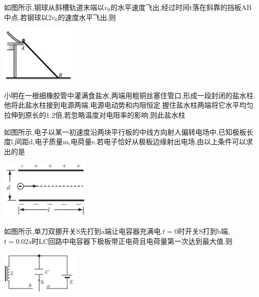 \question[6]如图所示,钢球从斜槽轨道末端以$v_0$的水平速度飞出,经过时间t落在斜靠的挡板AB中点.若钢球以$2v_0$的速度水平飞出,则\key{}\begin{center}\includegraphics[]{img/image3.png}\end{center}
\begin{solution}{4cm}

\end{solution}



\question[6]小明在一根细橡胶管中灌满食盐水,两端用粗铜丝塞住管口,形成一段封闭的盐水柱.他将此盐水柱接到电源两端,电源电动势和内阻恒定.握住盐水柱两端将它水平均匀拉伸到原长的$1.2$倍,若忽略温度对电阻率的影响,则此盐水柱\key{}
\begin{solution}{4cm}

\end{solution}



\question[6]如图所示,电子以某一初速度沿两块平行板的中线方向射人偏转电场中,已知极板长度l,间距d,电子质量m,电荷量e.若电子恰好从极板边缘射出电场,由以上条件可以求出的是\key{}\begin{center}\includegraphics[]{img/image4.png}\end{center}
\begin{solution}{4cm}

\end{solution}



\question[6]如图所示,单刀双挪开关S先打到a端让电容器充满电$.t=0$时开关S打到b端,$t=0.02s$时LC回路中电容器下极板带正电荷且电荷量第一次达到最大值.则\key{}\begin{center}\includegraphics[]{img/image5.png}\end{center}
\begin{solution}{4cm}

\end{solution}



